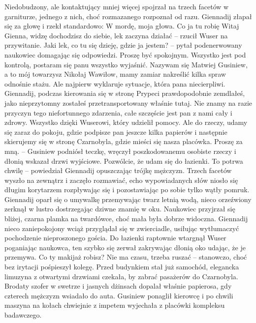 \documentclass[../MAIN.tex]{subfiles}
\begin{document}
Niedobudzony, ale kontaktujący mniej więcej spojrzał na trzech facetów w garniturze, jednego z nich, choć rozmazanego rozpoznał od razu. Giennadij złapał się za głowę i rzekł standardowo: 
% 
\sx W mordę, moja głowa. Co ja tu robię 
\xx Witaj Gienna, widzę dochodzisz do siebie, lek zaczyna działać -- rzucił Wuser na przywitanie. 
\xx Jaki lek, co tu się dzieję, gdzie ja jestem? -- pytał podenerwowany naukowiec domagając się odpowiedzi. 
\xx Proszę być spokojnym. Wszystko jest pod kontrolą, postaram się panu wszystko wyjaśnić. Nazywam się Matwiej Gusiniew, a to mój towarzysz Nikołaj Wawiłow, mamy zamiar nakreślić kilka spraw odnośnie stażu. Ale najpierw wyklaruje sytuacje, która pana niecierpliwi. Giennadij, podczas kierowania się w stronę Prypeci prawdopodobnie zemdlałeś, jako nieprzytomny zostałeś przetransportowany właśnie tutaj. Nie znamy na razie przyczyn tego niefortunnego zdarzenia, całe szczęście jest pan z nami cały i zdrowy. Wszystko dzięki Wuserowi, który udzielił pomocy. Ale do rzeczy, udamy się zaraz do pokoju, gdzie podpisze pan jeszcze kilka papierów i następnie skierujemy się w stronę Czarnobyla, gdzie mieści się nasza placówka. Proszę za mną. -- Gusiniew podniósł teczkę, wręczył poszkodowanemu osobiste rzeczy i dłonią wskazał drzwi wyjściowe. 
\xx Pozwólcie, że udam się do łazienki. To potrwa chwilę -- powiedział Giennadij opuszczając trójkę mężczyzn.
\qd
Trzech facetów wyszło na zewnątrz i zaczęło rozmawiać, echo wypowiadanych słów niosło się długim korytarzem rozpływając się i pozostawiając po sobie tylko wątły pomruk. Giennadij oparł się o umywalkę przemywając twarz letnią wodą, nieco orzeźwiony zerknął w lustro dostrzegając dziwne znamię w oku. Naukowiec przyjrzał się bliżej, czarna plamka na twardówce, choć mała była dobrze widoczna. Giennadij nieco zaniepokojony wciąż przyglądał się w zwierciadle, usiłując wytłumaczyć pochodzenie nieproszonego gościa. Do łazienki raptownie wtargnął Wuser poganiając naukowca, ten szybko się zerwał zakrywając dłonią oko udając, że je przemywa. 
% 
\sx Co ty makijaż robisz? Nie ma czasu, trzeba ruszać -- stanowczo, choć bez irytacji pośpieszył kolegę.
\qd
Przed budynkiem stał już samochód, elegancka limuzyna z otwartymi drzwiami czekała, by zabrać pasażerów do Czarnobyla. Brodaty szofer w swetrze i jasnych dżinsach dopalał właśnie papierosa, gdy czterech mężczyzn wsiadało do auta. Gusiniew ponaglił kierowcę i po chwili maszyna na kołach chwiejnie z impetem wyjechała z placówki kompleksu badawczego. 
\end{document}
